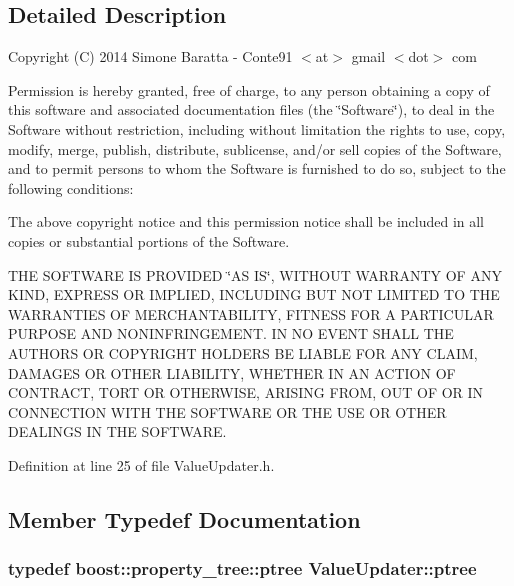 \subsection{Detailed Description}
Copyright (C) 2014 Simone Baratta -\/ Conte91 $<$at$>$ gmail $<$dot$>$ com

Permission is hereby granted, free of charge, to any person obtaining a copy of this software and associated documentation files (the \char`\"{}\+Software\char`\"{}), to deal in the Software without restriction, including without limitation the rights to use, copy, modify, merge, publish, distribute, sublicense, and/or sell copies of the Software, and to permit persons to whom the Software is furnished to do so, subject to the following conditions\+:

The above copyright notice and this permission notice shall be included in all copies or substantial portions of the Software.

T\+H\+E S\+O\+F\+T\+W\+A\+R\+E I\+S P\+R\+O\+V\+I\+D\+E\+D \char`\"{}\+A\+S I\+S\char`\"{}, W\+I\+T\+H\+O\+U\+T W\+A\+R\+R\+A\+N\+T\+Y O\+F A\+N\+Y K\+I\+N\+D, E\+X\+P\+R\+E\+S\+S O\+R I\+M\+P\+L\+I\+E\+D, I\+N\+C\+L\+U\+D\+I\+N\+G B\+U\+T N\+O\+T L\+I\+M\+I\+T\+E\+D T\+O T\+H\+E W\+A\+R\+R\+A\+N\+T\+I\+E\+S O\+F M\+E\+R\+C\+H\+A\+N\+T\+A\+B\+I\+L\+I\+T\+Y, F\+I\+T\+N\+E\+S\+S F\+O\+R A P\+A\+R\+T\+I\+C\+U\+L\+A\+R P\+U\+R\+P\+O\+S\+E A\+N\+D N\+O\+N\+I\+N\+F\+R\+I\+N\+G\+E\+M\+E\+N\+T. I\+N N\+O E\+V\+E\+N\+T S\+H\+A\+L\+L T\+H\+E A\+U\+T\+H\+O\+R\+S O\+R C\+O\+P\+Y\+R\+I\+G\+H\+T H\+O\+L\+D\+E\+R\+S B\+E L\+I\+A\+B\+L\+E F\+O\+R A\+N\+Y C\+L\+A\+I\+M, D\+A\+M\+A\+G\+E\+S O\+R O\+T\+H\+E\+R L\+I\+A\+B\+I\+L\+I\+T\+Y, W\+H\+E\+T\+H\+E\+R I\+N A\+N A\+C\+T\+I\+O\+N O\+F C\+O\+N\+T\+R\+A\+C\+T, T\+O\+R\+T O\+R O\+T\+H\+E\+R\+W\+I\+S\+E, A\+R\+I\+S\+I\+N\+G F\+R\+O\+M, O\+U\+T O\+F O\+R I\+N C\+O\+N\+N\+E\+C\+T\+I\+O\+N W\+I\+T\+H T\+H\+E S\+O\+F\+T\+W\+A\+R\+E O\+R T\+H\+E U\+S\+E O\+R O\+T\+H\+E\+R D\+E\+A\+L\+I\+N\+G\+S I\+N T\+H\+E S\+O\+F\+T\+W\+A\+R\+E. 

Definition at line 25 of file Value\+Updater.\+h.



\subsection{Member Typedef Documentation}
\hypertarget{class_value_updater_a3b22cec365a448f8d7854431ce104d9b}{
\subsubsection[{ptree}]{\setlength{\rightskip}{0pt plus 5cm}typedef boost\+::property\+\_\+tree\+::ptree {\bf Value\+Updater\+::ptree}\hspace{0.3cm}{\ttfamily [protected]}}}\label{class_value_updater_a3b22cec365a448f8d7854431ce104d9b}


